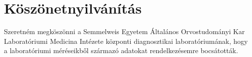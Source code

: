 \chapter*{Köszönetnyilvánítás}

Szeretném megköszönni a Semmelweis Egyetem Általános Orvostudományi Kar Laboratóriumi Medicina Intézete központi diagnosztikai laboratóriumának, hogy a laboratóriumi méréseikből származó adatokat rendelkezésemre bocsátották.